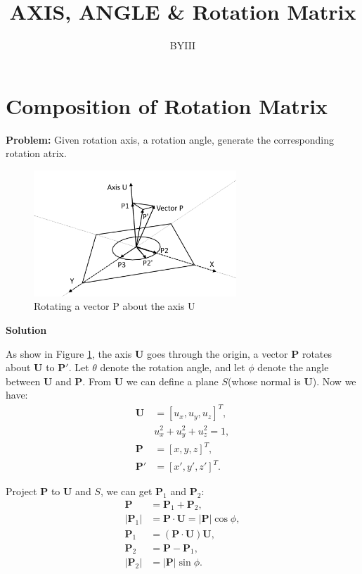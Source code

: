 \documentclass{article}
\begin{document}
\author{BYIII}
\title{AXIS, ANGLE \& Rotation Matrix}
\date{}

\maketitle

\section{Composition of Rotation Matrix}
\textbf{Problem:} Given rotation axis, a rotation angle, generate the corresponding rotation atrix.

\begin{figure}[!h]
\centering
\includegraphics[width=3in]{figures/axis_angle_rot3.png}
\caption{Rotating a vector P about the axis U}
\label{fig1}
\end{figure}

\noindent\textbf{Solution}


As show in Figure \ref{fig1}, the axis \textbf{U} goes through the origin, a vector \textbf{P} rotates about \textbf{U} to $\mathbf{P}'$. Let $\theta$ denote the rotation angle, and let $\phi$ denote the angle between \textbf{U} and \textbf{P}. From \textbf{U} we can define a plane $S$(whose normal is \textbf{U}). Now we have: 
\begin{displaymath}
\begin{split}
\mathbf{U} &= [u_x, u_y, u_z]^T, \\
&  u_x^2+u_y^2+u_z^2 = 1, \\
\mathbf{P} &= [x, y, z]^T, \\
\mathbf{P}' &= [x', y', z']^T.
\end{split}
\end{displaymath}

Project \textbf{P} to \textbf{U} and $S$, we can get $\mathbf{P}_1$ and $\mathbf{P}_2$:
\begin{displaymath}
\begin{split}
\mathbf{P} &= \mathbf{P}_1+\mathbf{P}_2, \\
|\mathbf{P}_1| &= \mathbf{P}\cdot\mathbf{U} = |\mathbf{P}|\cos{\phi}, \\
\mathbf{P}_1 &= (\mathbf{P}\cdot\mathbf{U})\mathbf{U}, \\
\mathbf{P}_2 &= \mathbf{P} - \mathbf{P}_1, \\
|\mathbf{P}_2| &=  |\mathbf{P}|\sin{\phi}.
\end{split}
\end{displaymath}
\end{document}
